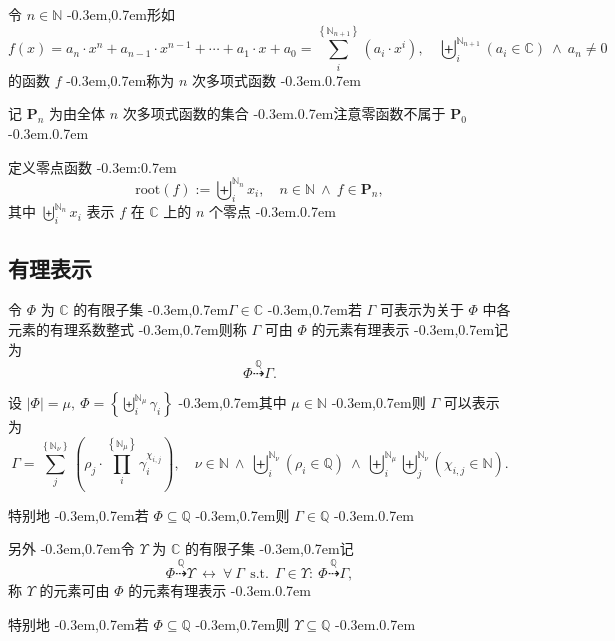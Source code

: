 \documentclass{article}
\newcommand\BrSetN[1]{\Set{\MathPartialSetN{#1}}}
\newcommand\InSetC[1]{\InSet{#1}{\MathSetC}}
\newcommand\InSetN[1]{\InSet{#1}{\MathSetN}}
\newcommand\InSetQ[1]{\InSet{#1}{\MathSetQ}}
\newcommand\MathPartialSetN[1]{\mathbb{N}_{#1}}
\newcommand\MathSetC{\mathbb{C}}
\newcommand\MathSetN{\mathbb{N}}
\newcommand\MathSetQ{\mathbb{Q}}
\newcommand\NormalSeqOfN[3]{\SeqOfN{#1}{#2}{#3_{#1}}}
\newcommand\ProdOfN[3]{\Prod{#1}{\BrSetN{#2}}{#3}}
\newcommand\SeqSetN[3]{\Set{\NormalSeqOfN{#1}{#2}{#3}}}
\newcommand\SeqOfNInSetC[3]{\SeqOfN{#1}{#2}{\Bracket{\InSetC{#3_{#1}}}}}
\newcommand\SeqOfNInSetQ[3]{\SeqOfN{#1}{#2}{\Bracket{\InSetQ{#3_{#1}}}}}
\newcommand\SeqOfNNInSetN[5]{\SeqOfN{#1}{#2}{\SeqOfN{#3}{#4}{\Bracket{\InSetN{#5_{\MultiSub{#1}{#3}}}}}}}
\newcommand\SeqOfN[3]{\Seq{#1}{\MathPartialSetN{#2}}{#3}}
\newcommand\SumOfN[3]{\Sum{#1}{\BrSetN{#2}}{#3}}
\newcommand\Abs[1]{\left| #1 \right|}
\newcommand\Bracket[1]{\left( #1 \right)}
\newcommand\BracketBig[1]{\left\{ #1 \right\}}
\newcommand\Colon{:}
\newcommand\Comma{,}
\newcommand\CommaAnd{\Space{\Comma}}
\newcommand\CommaSub{\Comma}
\newcommand\DefineAs{:=}
\newcommand\Domain[1]{\DomainComma \quad #1}
\newcommand\DomainAnd{\LogicAnd}
\newcommand\DomainComma{\Comma}
\newcommand\Equivalent{\Logic{\leftrightarrow}}
\newcommand\FlatPolynomial{a_{n} \cdot x^{n} + a_{n-1} \cdot x^{n-1} + \cdots + a_{1} \cdot x + a_{0}}
\newcommand\ForAll[3]{\Satisfy{\forall}{#1}{#2}{#3}}
\newcommand\Func[2]{#1 \Bracket{#2}}
\newcommand\InSet[2]{#1 \in #2}
\newcommand\InPolynomialSet[2]{\InSet{#1}{\PolynomialSet{#2}}}
\newcommand\Logic[1]{\ #1\ }
\newcommand\LogicAnd{\Logic{\wedge}}
\newcommand\MultiSub[2]{#1 \CommaSub #2}
\newcommand\NeqZero[1]{#1 \neq 0}
\newcommand\Polynomial[2]{\SumOfN{i}{#1}{\Bracket{#2_{i} \cdot x^{i}}}}
\newcommand\PolynomialA{\Polynomial{n+1}{a}}
\newcommand\PolynomialSet[1]{\mathbf{P}_{#1}}
\newcommand\Prod[3]{\prod_{#1}^{#2} #3}
\newcommand\RationalEx{\stackrel{\MathSetQ}{\dashrightarrow}}
\newcommand\Root[1]{\Func{\text{root}}{#1}}
\newcommand\Satisfy[4]{\Space{#1} #2 \SuchThat #3 \Space{\Colon} #4}
\newcommand\Seq[3]{\biguplus_{#1}^{#2} #3}
\newcommand\SeqX[1]{\NormalSeqOfN{i}{#1}{x}}
\newcommand\Set[1]{\BracketBig{#1}}
\newcommand\Space[1]{#1\ }
\newcommand\SubSetQ[1]{#1 \subseteq \MathSetQ}
\newcommand\SuchThat{\Logic{\Logic{\text{s.t.}}}}
\newcommand\Sum[3]{\sum_{#1}^{#2} #3}
\newcommand\EqEndComma{\Comma}
\newcommand\EqEndPeriod{.}
\newcommand\TextColon{\TextPunctuation{\Colon}}
\newcommand\TextComma{\TextPunctuation{\Comma}}
\newcommand\TextPeriod{\TextPunctuation{.}}
\newcommand\TextPunctuation[1]{\kern -0.3em#1\kern 0.7em}
\begin{document}
	令 $\InSetN{n}$ \TextComma 形如
	\begin{equation*}
	\Func{f}{x} = \FlatPolynomial = \PolynomialA \Domain{\SeqOfNInSetC{i}{n+1}{a} \DomainAnd \NeqZero{a_{n}}}
	\end{equation*}
	的函数 $f$ \TextComma 称为 $n$ 次多项式函数 \TextPeriod
	
	记 $\PolynomialSet{n}$ 为由全体 $n$ 次多项式函数的集合 \TextPeriod 注意零函数不属于 $\PolynomialSet{0}$ \TextPeriod
	
	定义零点函数 \TextColon
	\begin{equation*}
	\Root{f} \DefineAs \SeqX{n} \Domain{\InSetN{n} \DomainAnd \InPolynomialSet{f}{n}} \EqEndComma
	\end{equation*}
	其中 $\SeqX{n}$ 表示 $f$ 在 $\MathSetC$ 上的 $n$ 个零点 \TextPeriod
	
	
	\subsection{有理表示} \label{sec:2.6}
	令 $\Phi$ 为 $\MathSetC$ 的有限子集 \TextComma $\InSetC{\Gamma}$ \TextComma 若 $\Gamma$ 可表示为关于 $\Phi$ 中各元素的有理系数整式 \TextComma 则称 $\Gamma$ 可由 $\Phi$ 的元素有理表示 \TextComma 记为
	\begin{equation*}
	\Phi \RationalEx \Gamma \EqEndPeriod
	\end{equation*}
	
	设 $\Abs{\Phi} = \mu \CommaAnd \Phi = \SeqSetN{i}{\mu}{\gamma}$ \TextComma 其中 $\InSetN{\mu}$ \TextComma 则 $\Gamma$ 可以表示为
	\begin{equation*}
	\Gamma = \SumOfN{j}{\nu}{\Bracket{\rho_{j} \cdot \ProdOfN{i}{\mu}{\gamma_{i}^{\chi_{\MultiSub{i}{j}}}}}} \Domain{\InSetN{\nu} \DomainAnd \SeqOfNInSetQ{i}{\nu}{\rho} \DomainAnd \SeqOfNNInSetN{i}{\mu}{j}{\nu}{\chi}} \EqEndPeriod
	\end{equation*}
	
	特别地 \TextComma 若 $\SubSetQ{\Phi}$ \TextComma 则 $\InSetQ{\Gamma}$ \TextPeriod
	
	另外 \TextComma 令 $\Upsilon$ 为 $\MathSetC$ 的有限子集 \TextComma 记
	\begin{equation*}
	\Phi \RationalEx \Upsilon \Equivalent \ForAll{\Gamma}{\InSet{\Gamma}{\Upsilon}}{\Phi \RationalEx \Gamma} \EqEndComma
	\end{equation*}
	称 $\Upsilon$ 的元素可由 $\Phi$ 的元素有理表示 \TextPeriod
	
	特别地 \TextComma 若 $\SubSetQ{\Phi}$ \TextComma 则 $\SubSetQ{\Upsilon}$ \TextPeriod
	
\end{document}
